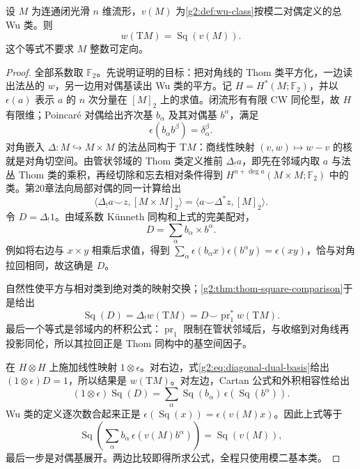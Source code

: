 \begin{theorem}[Wu 公式]\label{g2:thm:wu-formula}
	设 \(M\) 为连通闭光滑 \(n\) 维流形，\(v(M)\) 为\cref{g2:def:wu-class}按模二对偶定义的总 Wu 类。则
	\[
		w(\mathrm TM)=\operatorname{Sq}(v(M)).
	\]
	这个等式不要求 \(M\) 整数可定向。
\end{theorem}
\begin{proof}
	全部系数取 \(\mathbb F_2\)。先说明证明的目标：把对角线的 Thom 类平方化，一边读出法丛的 \(w\)，另一边用对偶基读出 Wu 类的平方。记 \(H=H^*(M;\mathbb F_2)\)，并以 \(\epsilon(a)\) 表示 \(a\) 的 \(n\) 次分量在 \([M]_2\) 上的求值。闭流形有有限 CW 同伦型，故 \(H\) 有限维；Poincaré 对偶给出齐次基 \(b_\alpha\) 及其对偶基 \(b^\alpha\)，满足
	\[
		\epsilon(b_\alpha b^\beta)=\delta_\alpha^\beta.
	\]
	对角嵌入 \(\Delta:M\hookrightarrow M\times M\) 的法丛同构于 \(\mathrm TM\)：商线性映射 \((v,w)\mapsto w-v\) 的核就是对角切空间。由管状邻域的 Thom 类定义推前 \(\Delta_!a\)，即先在邻域内取 \(a\) 与法丛 Thom 类的乘积，再经切除和忘去相对条件得到 \(H^{n+\deg a}(M\times M;\mathbb F_2)\) 中的类。第20章法向局部对偶的同一计算给出
	\[
		\langle\Delta_!a\smile z,[M\times M]_2\rangle
		=\langle a\smile\Delta^*z,[M]_2\rangle.
	\]
	令 \(D=\Delta_!1\)。由域系数 Künneth 同构和上式的完美配对，
	\begin{equation}\label{g2:eq:diagonal-dual-basis}
		D=\sum_\alpha b_\alpha\times b^\alpha.
	\end{equation}
	例如将右边与 \(x\times y\) 相乘后求值，得到 \(\sum_\alpha\epsilon(b_\alpha x)\epsilon(b^\alpha y)=\epsilon(xy)\)，恰与对角拉回相同，故这确是 \(D\)。

	自然性使平方与相对类到绝对类的映射交换；\cref{g2:thm:thom-square-comparison}于是给出
	\[
		\operatorname{Sq}(D)=\Delta_!w(\mathrm TM)
		=D\smile\operatorname{pr}_1^*w(\mathrm TM).
	\]
	最后一个等式是邻域内的杯积公式：\(\operatorname{pr}_1\) 限制在管状邻域后，与收缩到对角线再投影同伦，所以其拉回正是 Thom 同构中的基空间因子。

	在 \(H\otimes H\) 上施加线性映射 \(1\otimes\epsilon\)。对右边，式\eqref{g2:eq:diagonal-dual-basis}给出 \((1\otimes\epsilon)D=1\)，所以结果是 \(w(\mathrm TM)\)。对左边，Cartan 公式和外积相容性给出
	\[
		(1\otimes\epsilon)\operatorname{Sq}(D)
		=\sum_\alpha\operatorname{Sq}(b_\alpha)\,\epsilon(\operatorname{Sq}(b^\alpha)).
	\]
	Wu 类的定义逐次数合起来正是 \(\epsilon(\operatorname{Sq}(x))=\epsilon(v(M)x)\)。因此上式等于
	\[
		\operatorname{Sq}\left(\sum_\alpha b_\alpha\,\epsilon(v(M)b^\alpha)\right)
		=\operatorname{Sq}(v(M)),
	\]
	最后一步是对偶基展开。两边比较即得所求公式，全程只使用模二基本类。
\end{proof}

